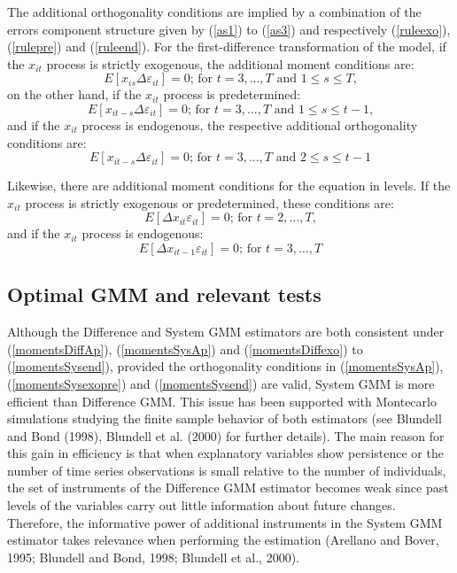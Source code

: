 \documentclass[a4paper, 12pt]{article}
\begin{document}
The additional orthogonality conditions are implied by a combination of the errors component structure given by (\ref{as1}) to (\ref{as3}) and respectively (\ref{ruleexo}), (\ref{rulepre}) and (\ref{ruleend}). For the first-difference transformation of the model, if the $x_{it}$ process is strictly exogenous, the additional moment conditions are:
\begin{equation}
\label{momentsDiffexo}
\tag{12'}
E\left[x_{is}\Delta \varepsilon_{it}\right]=0 \text{; for $t=3,...,T$ and $1\leq s \leq T$,}
\end{equation}
on the other hand, if the $x_{it}$ process is predetermined:
\begin{equation}
\label{momentsDiffpre}
\tag{13'}
E\left[x_{it-s}\Delta \varepsilon_{it}\right]=0 \text{; for $t=3,...,T$ and $1\leq s\leq t-1$,}
\end{equation}
and if the $x_{it}$ process is endogenous, the respective additional orthogonality conditions are:
\begin{equation}
\label{momentsDiffend}
\tag{14'}
E\left[x_{it-s}\Delta \varepsilon_{it}\right]=0 \text{; for $t=3,...,T$ and $2\leq s \leq t-1$}
\end{equation}

Likewise, there are additional moment conditions for the equation in levels. If the $x_{it}$ process is strictly exogenous or predetermined, these conditions are:
\begin{equation}
\label{momentsSysexopre}
\tag{15'}
E\left[\Delta x_{it}\varepsilon_{it}\right]=0 \text{; for $t=2,...,T$,}
\end{equation}
and if the $x_{it}$ process is endogenous:
\begin{equation}
\label{momentsSysend}
\tag{16'}
E\left[\Delta x_{it-1}\varepsilon_{it}\right]=0 \text{; for $t=3,...,T$}
\end{equation}

\subsection*{Optimal GMM and relevant tests}

Although the Difference and System GMM estimators are both consistent under (\ref{momentsDiffAp}), (\ref{momentsSysAp}) and (\ref{momentsDiffexo}) to (\ref{momentsSysend}), provided the orthogonality conditions in (\ref{momentsSysAp}), (\ref{momentsSysexopre}) and (\ref{momentsSysend}) are valid,  System GMM is more efficient than Difference GMM. This issue has been supported with Montecarlo simulations studying the finite sample behavior of both estimators (see Blundell and Bond (1998), Blundell et al. (2000) for further details). The main reason for this gain in efficiency is that when explanatory variables show persistence or the number of time series observations is small relative to the number of individuals, the set of instruments of the Difference GMM estimator becomes weak since past levels of the variables carry out little information about future changes. Therefore, the informative power of additional instruments in the System GMM estimator takes relevance when performing the estimation (Arellano and Bover, 1995; Blundell and Bond, 1998; Blundell et al., 2000).
\end{document}
